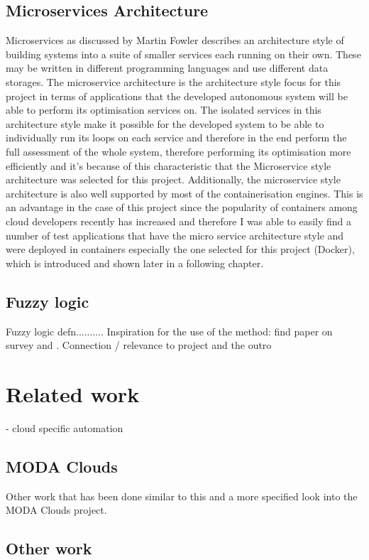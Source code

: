 \subsection{Microservices Architecture}
Microservices as discussed by Martin Fowler \cite{Microservices} describes an architecture style of building systems into a suite of smaller services each running on their own. These may be written in different programming languages and use different data storages. The microservice architecture is the architecture style focus for this project in terms of applications that the developed autonomous system will be able to perform its optimisation services on. The isolated services in this architecture style make it possible for the developed system to be able to individually run its loops on each service and therefore in the end perform the full assessment of the whole system, therefore performing its optimisation more efficiently and it's because of this characteristic that the Microservice style architecture was selected for this project. Additionally, the microservice style architecture is also well supported by most of the containerisation engines. This is an advantage in the case of this project since the popularity of containers among cloud developers recently has increased and therefore I was able to easily find a number of test applications that have the micro service architecture style and were deployed in containers especially the one selected for this project (Docker), which is introduced and shown later in a following chapter. 

\subsection{Fuzzy logic}
Fuzzy logic defn\cite{zadeh1996fuzzy}.......... Inspiration for the use of the method: find paper on survey and \cite{}. Connection / relevance to project and the outro

\section{Related work}
- cloud specific automation
\subsection{MODA Clouds}
Other work that has been done similar to this and a more specified look into the MODA Clouds project.
\subsection{Other work}
\cite{qu2018auto}







